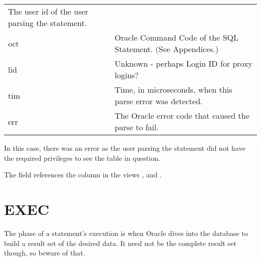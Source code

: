 \begin{longtable}[]{@{}l|l@{}}
\begin{minipage}[t]{0.65\columnwidth}
The user id of the user parsing the statement.\strut
\end{minipage}\tabularnewline
\begin{minipage}[t]{0.14\columnwidth}\raggedright\strut
oct\strut
\end{minipage} & \begin{minipage}[t]{0.65\columnwidth}\raggedright\strut
Oracle Command Code of the SQL Statement. (See Appendices.)\strut
\end{minipage}\tabularnewline
\begin{minipage}[t]{0.14\columnwidth}\raggedright\strut
lid\strut
\end{minipage} & \begin{minipage}[t]{0.65\columnwidth}\raggedright\strut
Unknown - perhaps Login ID for proxy logins?\strut
\end{minipage}\tabularnewline
\begin{minipage}[t]{0.14\columnwidth}\raggedright\strut
tim\strut
\end{minipage} & \begin{minipage}[t]{0.65\columnwidth}\raggedright\strut
Time, in microseconds, when this parse error was detected.\strut
\end{minipage}\tabularnewline
\begin{minipage}[t]{0.14\columnwidth}\raggedright\strut
err\strut
\end{minipage} & \begin{minipage}[t]{0.65\columnwidth}\raggedright\strut
The Oracle error code that caused the parse to fail.\strut
\end{minipage}\tabularnewline
\bottomrule
\end{longtable}

In this case, there was an error  as the user parsing the statement did not have the required privileges to see the table in question.

The  field references the column  in the views ,  and .

\newpage\section{EXEC}\label{exec}

The  phase of a statement's execution is when Oracle dives into the database to build a result set of the desired data. It need not be the complete result set though, so beware of that.

